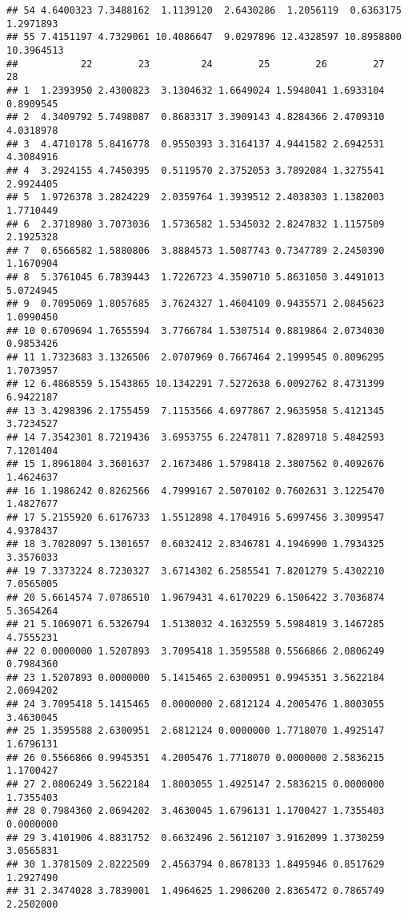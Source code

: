 \documentclass[
]{article}
\begin{document}
\begin{verbatim}
## 54 4.6400323 7.3488162  1.1139120  2.6430286  1.2056119  0.6363175  1.2971893
## 55 7.4151197 4.7329061 10.4086647  9.0297896 12.4328597 10.8958800 10.3964513
##           22        23         24        25        26        27        28
## 1  1.2393950 2.4300823  3.1304632 1.6649024 1.5948041 1.6933104 0.8909545
## 2  4.3409792 5.7498087  0.8683317 3.3909143 4.8284366 2.4709310 4.0318978
## 3  4.4710178 5.8416778  0.9550393 3.3164137 4.9441582 2.6942531 4.3084916
## 4  3.2924155 4.7450395  0.5119570 2.3752053 3.7892084 1.3275541 2.9924405
## 5  1.9726378 3.2824229  2.0359764 1.3939512 2.4038303 1.1382003 1.7710449
## 6  2.3718980 3.7073036  1.5736582 1.5345032 2.8247832 1.1157509 2.1925328
## 7  0.6566582 1.5880806  3.8884573 1.5087743 0.7347789 2.2450390 1.1670904
## 8  5.3761045 6.7839443  1.7226723 4.3590710 5.8631050 3.4491013 5.0724945
## 9  0.7095069 1.8057685  3.7624327 1.4604109 0.9435571 2.0845623 1.0990450
## 10 0.6709694 1.7655594  3.7766784 1.5307514 0.8819864 2.0734030 0.9853426
## 11 1.7323683 3.1326506  2.0707969 0.7667464 2.1999545 0.8096295 1.7073957
## 12 6.4868559 5.1543865 10.1342291 7.5272638 6.0092762 8.4731399 6.9422187
## 13 3.4298396 2.1755459  7.1153566 4.6977867 2.9635958 5.4121345 3.7234527
## 14 7.3542301 8.7219436  3.6953755 6.2247811 7.8289718 5.4842593 7.1201404
## 15 1.8961804 3.3601637  2.1673486 1.5798418 2.3807562 0.4092676 1.4624637
## 16 1.1986242 0.8262566  4.7999167 2.5070102 0.7602631 3.1225470 1.4827677
## 17 5.2155920 6.6176733  1.5512898 4.1704916 5.6997456 3.3099547 4.9378437
## 18 3.7028097 5.1301657  0.6032412 2.8346781 4.1946990 1.7934325 3.3576033
## 19 7.3373224 8.7230327  3.6714302 6.2585541 7.8201279 5.4302210 7.0565005
## 20 5.6614574 7.0786510  1.9679431 4.6170229 6.1506422 3.7036874 5.3654264
## 21 5.1069071 6.5326794  1.5138032 4.1632559 5.5984819 3.1467285 4.7555231
## 22 0.0000000 1.5207893  3.7095418 1.3595588 0.5566866 2.0806249 0.7984360
## 23 1.5207893 0.0000000  5.1415465 2.6300951 0.9945351 3.5622184 2.0694202
## 24 3.7095418 5.1415465  0.0000000 2.6812124 4.2005476 1.8003055 3.4630045
## 25 1.3595588 2.6300951  2.6812124 0.0000000 1.7718070 1.4925147 1.6796131
## 26 0.5566866 0.9945351  4.2005476 1.7718070 0.0000000 2.5836215 1.1700427
## 27 2.0806249 3.5622184  1.8003055 1.4925147 2.5836215 0.0000000 1.7355403
## 28 0.7984360 2.0694202  3.4630045 1.6796131 1.1700427 1.7355403 0.0000000
## 29 3.4101906 4.8831752  0.6632496 2.5612107 3.9162099 1.3730259 3.0565831
## 30 1.3781509 2.8222509  2.4563794 0.8678133 1.8495946 0.8517629 1.2927490
## 31 2.3474028 3.7839001  1.4964625 1.2906200 2.8365472 0.7865749 2.2502000

\end{verbatim}
\end{document}
